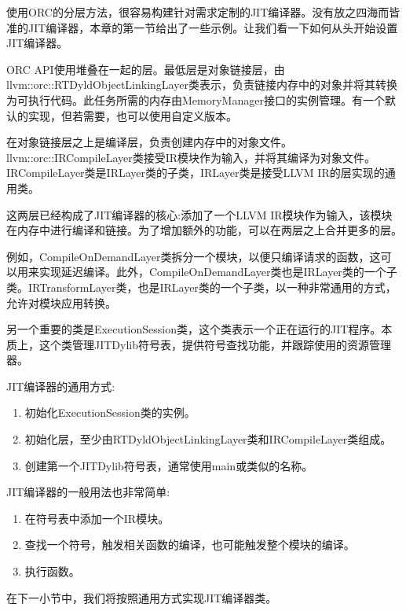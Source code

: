 
使用ORC的分层方法，很容易构建针对需求定制的JIT编译器。没有放之四海而皆准的JIT编译器，本章的第一节给出了一些示例。让我们看一下如何从头开始设置JIT编译器。

ORC API使用堆叠在一起的层。最低层是对象链接层，由llvm::orc::RTDyldObjectLinkingLayer类表示，负责链接内存中的对象并将其转换为可执行代码。此任务所需的内存由MemoryManager接口的实例管理。有一个默认的实现，但若需要，也可以使用自定义版本。

在对象链接层之上是编译层，负责创建内存中的对象文件。llvm::orc::IRCompileLayer类接受IR模块作为输入，并将其编译为对象文件。IRCompileLayer类是IRLayer类的子类，IRLayer类是接受LLVM IR的层实现的通用类。

这两层已经构成了JIT编译器的核心:添加了一个LLVM IR模块作为输入，该模块在内存中进行编译和链接。为了增加额外的功能，可以在两层之上合并更多的层。

例如，CompileOnDemandLayer类拆分一个模块，以便只编译请求的函数，这可以用来实现延迟编译。此外，CompileOnDemandLayer类也是IRLayer类的一个子类。IRTransformLayer类，也是IRLayer类的一个子类，以一种非常通用的方式，允许对模块应用转换。

另一个重要的类是ExecutionSession类，这个类表示一个正在运行的JIT程序。本质上，这个类管理JITDylib符号表，提供符号查找功能，并跟踪使用的资源管理器。

JIT编译器的通用方式:

\begin{enumerate}
\item
初始化ExecutionSession类的实例。

\item
初始化层，至少由RTDyldObjectLinkingLayer类和IRCompileLayer类组成。

\item
创建第一个JITDylib符号表，通常使用main或类似的名称。
\end{enumerate}

JIT编译器的一般用法也非常简单:

\begin{enumerate}
\item
在符号表中添加一个IR模块。

\item
查找一个符号，触发相关函数的编译，也可能触发整个模块的编译。

\item
执行函数。
\end{enumerate}

在下一小节中，我们将按照通用方式实现JIT编译器类。


